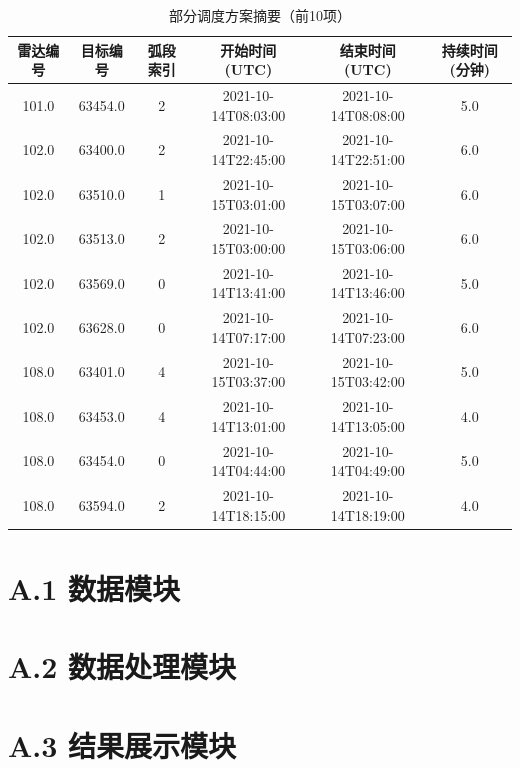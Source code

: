 \documentclass[openany,zihao=-4,UTF8]{ctexart}
\begin{document}
\begin{table}
    \centering
    \caption{部分调度方案摘要（前10项）}
    \label{tab:schedule_summary}
    \begin{tabular}{|c|c|c|c|c|c|}
        \hline
        \textbf{雷达编号} & \textbf{目标编号} & \textbf{弧段索引} & \textbf{开始时间 (UTC)} & \textbf{结束时间 (UTC)} & \textbf{持续时间 (分钟)} \\
        \hline
        101.0         & 63454.0       & 2             & 2021-10-14T08:03:00 & 2021-10-14T08:08:00 & 5.0                \\
        \hline
        102.0         & 63400.0       & 2             & 2021-10-14T22:45:00 & 2021-10-14T22:51:00 & 6.0                \\
        \hline
        102.0         & 63510.0       & 1             & 2021-10-15T03:01:00 & 2021-10-15T03:07:00 & 6.0                \\
        \hline
        102.0         & 63513.0       & 2             & 2021-10-15T03:00:00 & 2021-10-15T03:06:00 & 6.0                \\
        \hline
        102.0         & 63569.0       & 0             & 2021-10-14T13:41:00 & 2021-10-14T13:46:00 & 5.0                \\
        \hline
        102.0         & 63628.0       & 0             & 2021-10-14T07:17:00 & 2021-10-14T07:23:00 & 6.0                \\
        \hline
        108.0         & 63401.0       & 4             & 2021-10-15T03:37:00 & 2021-10-15T03:42:00 & 5.0                \\
        \hline
        108.0         & 63453.0       & 4             & 2021-10-14T13:01:00 & 2021-10-14T13:05:00 & 4.0                \\
        \hline
        108.0         & 63454.0       & 0             & 2021-10-14T04:44:00 & 2021-10-14T04:49:00 & 5.0                \\
        \hline
        108.0         & 63594.0       & 2             & 2021-10-14T18:15:00 & 2021-10-14T18:19:00 & 4.0                \\
        \hline
    \end{tabular}
\end{table}

\newpage
\section*{A.1 数据模块}


\newpage
\section*{A.2 数据处理模块}


\newpage
\section*{A.3 结果展示模块}

\end{document}
